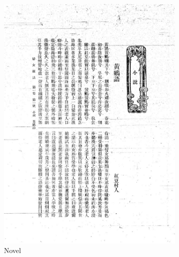 \documentclass[12pt,twoside]{report}
\begin{document}
\begin{figure}[htbp]
\begin{subfigure}[b]{0.23\linewidth}
        \includegraphics[width=\linewidth]{./figures/fnzz3.2}
        \caption{Novel}
        \label{fig:fnzz3.2}
    \end{subfigure}
    \hfill
    \begin{subfigure}[b]{0.23\linewidth}

\end{subfigure}
\end{figure}
\end{document}
